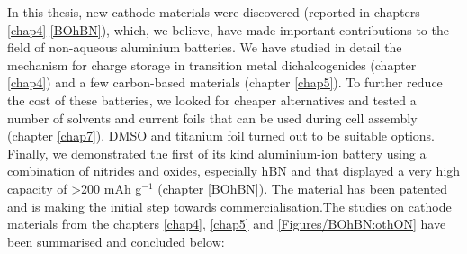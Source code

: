 In this thesis, new cathode materials were discovered (reported in chapters \ref{chap4}-\ref{BOhBN}), which, we believe, have made important contributions to the field of non-aqueous aluminium batteries. We have studied in detail the mechanism for charge storage in transition metal dichalcogenides (chapter \ref{chap4})  and a few carbon-based materials (chapter \ref{chap5}). To further reduce the cost of these batteries, we looked for cheaper alternatives and tested a number of solvents and current foils that can be used during cell assembly (chapter \ref{chap7}). DMSO and titanium foil turned out to be suitable options. Finally, we demonstrated the first of its kind aluminium-ion battery using a combination of nitrides and oxides, especially hBN and  that displayed a very high capacity  of >200 mAh g$^{-1}$ (chapter \ref{BOhBN}). The material has been patented and is making the initial step towards commercialisation.The studies on cathode materials from the chapters \ref{chap4}, \ref{chap5} and \ref{Figures/BOhBN:othON} have been summarised and concluded below:\\
